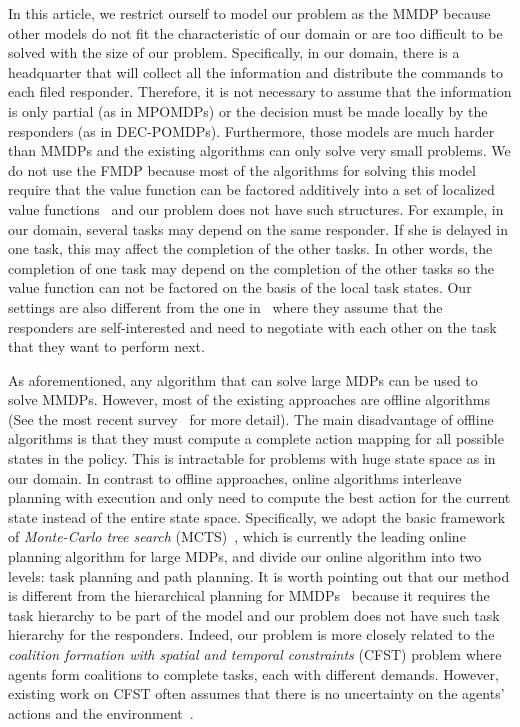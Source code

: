 In this article, we restrict ourself to model our problem as the
MMDP because other models do not fit the characteristic of our
domain or are too difficult to be solved with the size of our
problem. Specifically, in our domain, there is a headquarter that
will collect all the information and distribute the commands to
each filed responder. Therefore, it is not necessary to assume that
the information is only partial (as in MPOMDPs) or the decision
must be made locally by the responders (as in DEC-POMDPs).
Furthermore, those models are much harder than MMDPs and the
existing algorithms can only solve very small problems. We do not
use the FMDP because most of the algorithms for solving this model
require that the value function can be factored additively into a
set of localized value
functions~\cite{koller2000policy,guestrin2001multiagent,guestrin2003efficient}
and our problem does not have such structures. For example, in our
domain, several tasks may depend on the same responder. If she is
delayed in one task, this may affect the completion of the other
tasks. In other words, the completion of one task may depend on the
completion of the other tasks so the value function can not be
factored on the basis of the local task states. Our settings are
also different from the one in~\cite{Chapman2009} where they assume
that the responders are self-interested and need to negotiate with
each other on the task that they want to perform next.

As aforementioned, any algorithm that can solve large MDPs can be
used to solve MMDPs. However, most of the existing approaches are
offline algorithms (See the most recent
survey~\cite{kolobov2012planning} for more detail). The main
disadvantage of offline algorithms is that they must compute a
complete action mapping for all possible states in the policy. This
is intractable for problems with huge state space as in our domain.
In contrast to offline approaches, online algorithms interleave
planning with execution and only need to compute the best action
for the current state instead of the entire state space.
Specifically, we adopt the basic framework of {\em Monte-Carlo tree
search} (MCTS)~\cite{kocsis2006bandit}, which is currently the
leading online planning algorithm for large MDPs, and divide our
online algorithm into two levels: task planning and path planning.
It is worth pointing out that our method is different from the
hierarchical planning for MMDPs~\cite{musliner2006coordinated}
because it requires the task hierarchy to be part of the model and
our problem does not have such task hierarchy for the responders.
Indeed, our problem is more closely related to the {\em coalition
formation with spatial and temporal constraints} (CFST) problem
where agents form coalitions to complete tasks, each with different
demands. However, existing work on CFST often assumes that there is
no uncertainty on the agents' actions and the
environment~\cite{ramchurn:etal:2010}.
